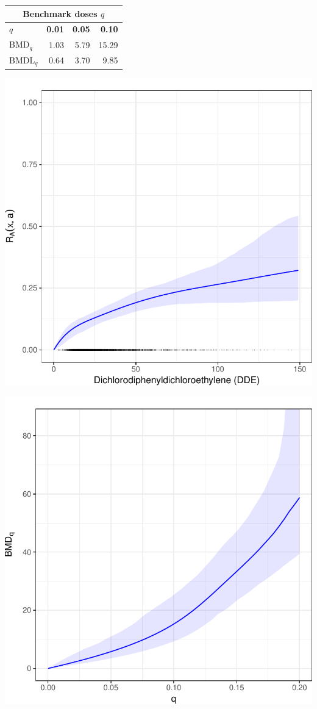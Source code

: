 \documentclass[a0,portrait]{a0poster}
\begin{document}
\begin{multicols}{2}
%
\begin{minipage}{0.15\textwidth}
\begin{tabular}{lrrr}
 \multicolumn{4}{c}{Benchmark doses $q$}\\
    \hline
  $q$& {\bf 0.01} & {\bf 0.05} & {\bf 0.10}  \\ 
  \hline
 BMD$_q$ & 1.03  & 5.79 & 15.29 \\ 
 BMDL$_q$ & 0.64 & 3.70 & 9.85 \\
   \hline
\end{tabular}
\end{minipage}
%
\begin{minipage}[c]{0.15\textwidth}
\includegraphics[width=1\textwidth]{cpp_risk}
\end{minipage}
%
\begin{minipage}[c]{0.15\textwidth}
\includegraphics[width=1\textwidth]{cpp_bmd}

\end{minipage}
\end{multicols}
\end{document}
